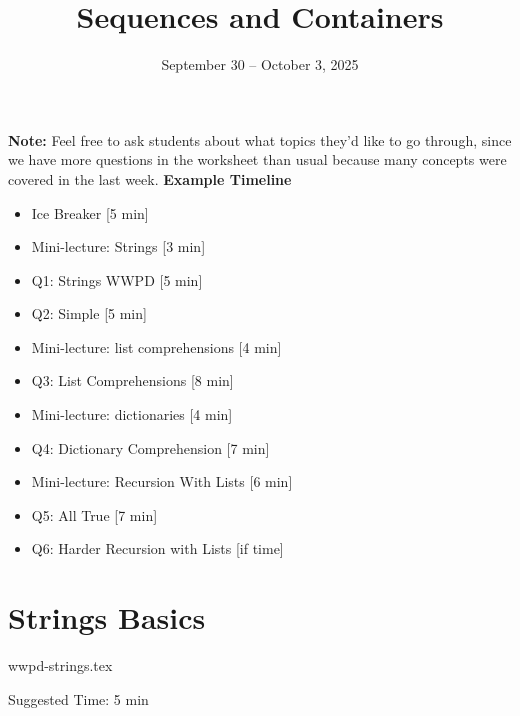 \documentclass{exam}
\title{Sequences and Containers}
\date{September 30 -- October 3, 2025}
\begin{document}
\maketitle

\begin{meta}
    \textbf{Note:} Feel free to ask students about what topics they'd like to go through, since we have more questions in the worksheet than usual because many concepts were covered in the last week. 
    \textbf{Example Timeline}
    \begin{itemize}
        \item Ice Breaker [5 min]
        \item Mini-lecture: Strings [3 min]
        \item Q1: Strings WWPD [5 min]
        \item Q2: Simple [5 min]
        \item Mini-lecture: list comprehensions [4 min]
        \item Q3: List Comprehensions [8 min]
        \item Mini-lecture: dictionaries [4 min]
        \item Q4: Dictionary Comprehension [7 min]
        \item Mini-lecture: Recursion With Lists [6 min]
        \item Q5: All True [7 min]
        \item Q6: Harder Recursion with Lists [if time]
    \end{itemize}

\end{meta}

\section{Strings Basics}
\begin{questions}
    {wwpd-strings.tex}
    \begin{questionmeta}
        Suggested Time: 5 min
    \end{questionmeta}
\end{questions}
\end{document}
